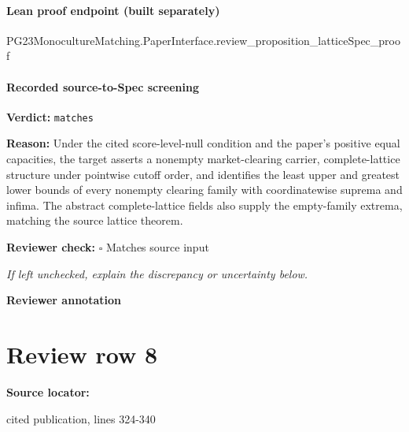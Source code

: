 \documentclass[10pt]{article}
\newcommand{\reviewerbox}{%
  \par\noindent\fbox{\parbox{0.96\linewidth}{\rule{0pt}{0.38in}}}\par
}
\newcommand{\reviewmatch}[1]{%
  \par\noindent\textbf{Reviewer check:} $\square$\; #1\par
  \noindent\emph{If left unchecked, explain the discrepancy or uncertainty below.}\par
}
\begin{document}
\paragraph{Lean proof endpoint (built separately)}\begin{ReviewVerbatim}
PG23MonocultureMatching.PaperInterface.review_proposition_latticeSpec_proof
\end{ReviewVerbatim}

\paragraph{Recorded source-to-Spec screening}
\textbf{Verdict:} \texttt{matches}
\\
{\raggedright
\textbf{Reason:} Under the cited score-\allowbreak{}level-\allowbreak{}null condition and the paper's positive equal capacities, the target asserts a nonempty market-\allowbreak{}clearing carrier, complete-\allowbreak{}lattice structure under pointwise cutoff order, and identifies the least upper and greatest lower bounds of every nonempty clearing family with coordinatewise suprema and infima.\allowbreak{} The abstract complete-\allowbreak{}lattice fields also supply the empty-\allowbreak{}family extrema, matching the source lattice theorem.\allowbreak{}
\par}
\reviewmatch{Matches source input}
\noindent\textbf{Reviewer annotation}\par
\reviewerbox
\clearpage
\hypertarget{source-claim-e975bc2795ef7baf}{}
\section*{Review row 8}
\textbf{Source locator:} {\footnotesize\raggedright cited publication, lines 324-\allowbreak{}340\par}
\end{document}
